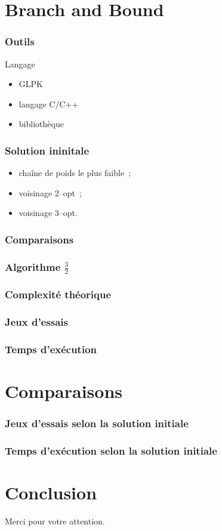 \documentclass[french]{beamer}
\begin{document}
\section{Branch and Bound}

\begin{frame}
\frametitle{Outils}
\begin{block}{Langage}
\begin{itemize}
\item GLPK
\item langage C/C++
\item bibliothèque
\end{itemize}
\end{block}
\end{frame}

\begin{frame}
\frametitle{Solution ininitale}
\begin{itemize}
\item chaîne de poids le plus faible~;
\item voisinage 2--opt~;
\item voisinage 3--opt.
\end{itemize}
\end{frame}


\begin{frame}
\frametitle{Comparaisons}
\end{frame}

\begin{frame}
\frametitle{Algorithme $\frac{3}{2}$}
\end{frame}

\begin{frame}
\frametitle{Complexité théorique}
\end{frame}

\begin{frame}
\frametitle{Jeux d'essais}
\end{frame}

\begin{frame}
\frametitle{Temps d'exécution}
\end{frame}


\section{Comparaisons}


\begin{frame}
\frametitle{Jeux d'essais selon la solution initiale}

\end{frame}

\begin{frame}
\frametitle{Temps d'exécution selon la solution initiale}
\end{frame}

\section{Conclusion}
\begin{frame}

\end{frame}


\begin{frame}
\begin{center}
Merci pour votre attention.
\end{center}
\end{frame}
\end{document}
